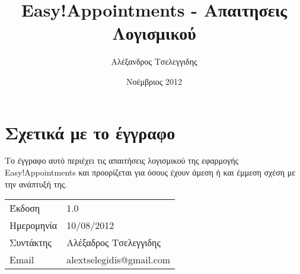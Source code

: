 \documentclass[12pt]{article}
\title{Easy!Appointments - Απαιτησεις Λογισμικού}
\author{Αλέξανδρος Τσελεγγιδης}
\date{Νοέμβριος 2012}
\begin{document}
\maketitle 
\pagebreak

\section{Σχετικά με το έγγραφο}
Το έγγραφο αυτό περιέχει τις απαιτήσεις λογισμικού της εφαρμογής Easy!Appointments  και προορίζεται για όσους έχουν άμεση ή και έμμεση σχέση με την ανάπτυξή της.

\begin{table}[ht]
\begin{tabular}{l l}
Έκδοση & 1.0 \\
Ημερομηνία & 10/08/2012 \\
Συντάκτης & Αλέξαδρος Τσελεγγιδης \\
Email & alextselegidis@gmail.com \\ [1ex]
\end{tabular}
\end{table}
\end{document}
